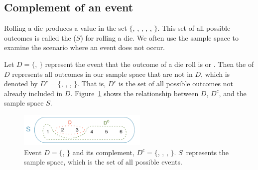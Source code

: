 \subsection{Complement of an event}

Rolling a die produces a value in the set $\{$, , , , , $\}$. This set of all possible outcomes is called the  ($S$) for rolling a die. We often use the sample space to examine the scenario where an event does not occur.

Let $D=\{$, $\}$ represent the event that the outcome of a die roll is  or . Then the  of $D$ represents all outcomes in our sample space that are not in $D$, which is denoted by $D^c = \{$, , , $\}$. That is, $D^c$ is the set of all possible outcomes not already included in $D$. Figure~\ref{complementOfD} shows the relationship between $D$, $D^c$, and the sample space $S$. 

\begin{figure}[hht]
\centering
\includegraphics[width=0.55\textwidth]{ch_probability/figures/complementOfD/complementOfD}
\caption{Event $D=\{$, $\}$ and its complement, $D^c = \{$, , , $\}$. $S$~represents the sample space, which is the set of all possible events.}
\label{complementOfD}
\end{figure}

